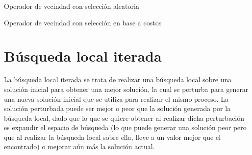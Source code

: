 \documentclass{ci5652}
\begin{document}
\begin{algorithm}
    \DontPrintSemicolon
    \vspace*{0.1cm}
    \vspace*{0.1cm}
    \caption{Operador de vecindad con selección aleatoria}
\end{algorithm}

\begin{algorithm}
    \DontPrintSemicolon
    \vspace*{0.1cm}
    \vspace*{0.1cm}
    \caption{Operador de vecindad con selección en base a costos}
\end{algorithm}

\section{Búsqueda local iterada}
La búsqueda local iterada se trata de realizar una búsqueda local sobre una solución inicial para obtener una mejor solución, la cual se perturba para generar una nueva solución inicial que se utiliza para realizar el mismo proceso. La solución perturbada puede ser mejor o peor que la solución generada por la búsqueda local, dado que lo que se quiere obtener al realizar dicha perturbación es expandir el espacio de búsqueda (lo que puede generar una solución peor pero que al realizar la búsqueda local sobre ella, lleve a un valor mejor que el encontrado) o mejorar aún más la solución actual.
\end{document}
